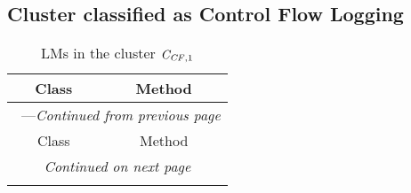 \subsection{Cluster classified as Control Flow Logging}

\begin{center}
\begin{longtable}{ll}
\caption{LMs in the cluster $\mathit{C}_{\mathit{CF},1}$}\\
\toprule\multicolumn{1}{c}{Class}&\multicolumn{1}{c}{Method}\\\midrule
\endfirsthead

\multicolumn{2}{c}{\tablename\ \thetable{}---\textit{Continued from previous page}} \\\midrule
\multicolumn{1}{c}{Class}&\multicolumn{1}{c}{Method}\\\midrule
\endhead
\multicolumn{2}{c}{\textit{Continued on next page}}\\\midrule
\endfoot
\bottomrule
\endlastfoot


\end{longtable}
\end{center}
